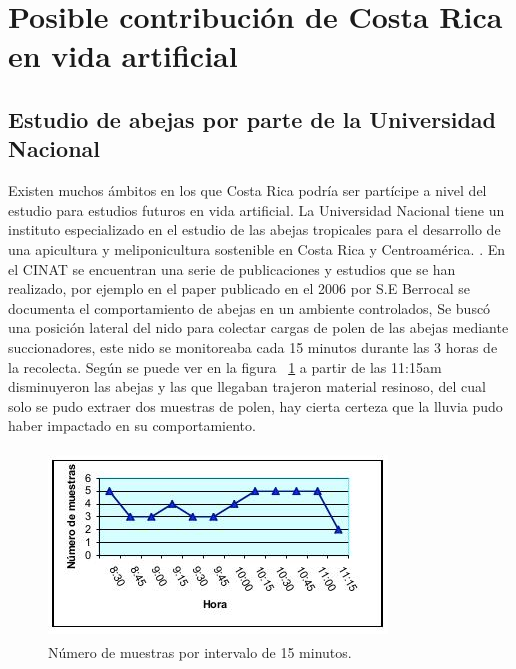 \documentclass[conference]{IEEEtran}
\begin{document}
\section{Posible contribuci\'on de Costa Rica en vida artificial}

\subsection{Estudio de abejas por parte de la Universidad Nacional}
Existen muchos \'ambitos en los que Costa Rica podr\'ia ser part\'icipe a nivel del estudio para estudios futuros en vida artificial. La Universidad Nacional tiene un instituto especializado en el estudio de las abejas tropicales para el desarrollo de una apicultura y meliponicultura sostenible en Costa Rica y Centroam\'erica. \cite{CINAT} . En el CINAT se encuentran una serie de publicaciones y estudios que se han realizado, por ejemplo en el paper publicado en el 2006 por S.E Berrocal se documenta el comportamiento de abejas en un ambiente controlados, Se busc\'o una posici\'on lateral del nido para colectar cargas de polen de las abejas mediante succionadores, este nido se monitoreaba cada 15 minutos durante las 3 horas de la recolecta. Seg\'un se puede ver en la figura ~\ref{fig:muestra} a partir de las 11:15am disminuyeron las abejas y las que llegaban trajeron material resinoso, del cual solo se pudo extraer dos muestras de polen, hay cierta certeza que la lluvia pudo haber impactado en su comportamiento.\cite{APICOLA}
\begin{figure}[ht]
  \includegraphics[width=9cm,height=5cm]{img/muestras.jpg}
  \caption{N\'umero de muestras por intervalo de 15 minutos. \cite{APICOLA}}
  \label{fig:muestra}
\end{figure}
\end{document}
